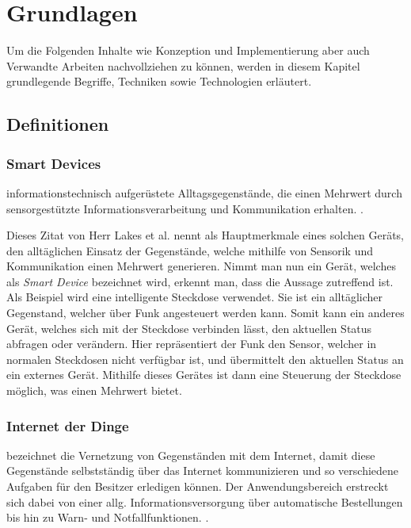 \chapter{Grundlagen}
Um die Folgenden Inhalte wie Konzeption und Implementierung aber auch Verwandte Arbeiten nachvollziehen zu können, werden in diesem Kapitel grundlegende Begriffe, Techniken sowie Technologien erläutert.

\section{Definitionen}
    \subsection{Smart Devices} \label{SmartDevices}
        \glqq informationstechnisch aufgerüstete Alltagsgegenstände, die einen Mehrwert durch sensorgestützte Informationsverarbeitung und Kommunikation erhalten.\grqq{} \cite{lackes_siepermann_2018}.
        
        Dieses Zitat von Herr Lakes et al. nennt als Hauptmerkmale eines solchen Geräts, den alltäglichen Einsatz der Gegenstände, welche mithilfe von Sensorik und Kommunikation einen Mehrwert generieren.
        Nimmt man nun ein Gerät, welches als \emph{Smart Device} bezeichnet wird, erkennt man, dass die Aussage zutreffend ist. Als Beispiel wird eine intelligente Steckdose verwendet. Sie ist ein alltäglicher Gegenstand, welcher über Funk angesteuert werden kann. Somit kann ein anderes Gerät, welches sich mit der Steckdose verbinden lässt, den aktuellen Status abfragen oder verändern.
        Hier repräsentiert der Funk den Sensor, welcher in normalen Steckdosen nicht verfügbar ist, und übermittelt den aktuellen Status an ein externes Gerät. Mithilfe dieses Gerätes ist dann eine Steuerung der Steckdose möglich, was einen Mehrwert bietet.
    
    \subsection{Internet der Dinge}
        \glqq bezeichnet die Vernetzung von Gegenständen mit dem Internet, damit diese Gegenstände selbstständig über das Internet kommunizieren und so verschiedene Aufgaben für den Besitzer erledigen können. Der Anwendungsbereich erstreckt sich dabei von einer allg. Informationsversorgung über automatische Bestellungen bis hin zu Warn- und Notfallfunktionen.\grqq{}
        \cite{lackes_siepermann_2018_iot}.
    
